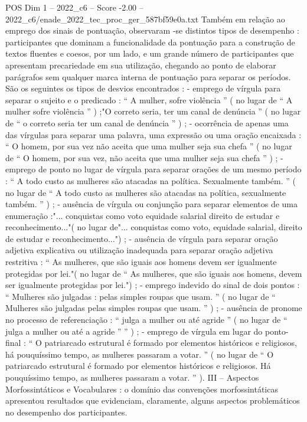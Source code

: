 \begin{textsample}{POS Dim 1 – 2022\_c6 – Score -2.00 – 2022\_c6/enade\_2022\_tec\_proc\_ger\_587bf59e0a.txt}
Também em relação ao emprego dos sinais de pontuação, observaram -se distintos tipos de desempenho : participantes que dominam a funcionalidade da pontuação para a construção de textos fluentes e coesos, por um lado, e um grande número de participantes que apresentam precariedade em sua utilização, chegando ao ponto de elaborar parágrafos sem qualquer marca interna de pontuação para separar os períodos.
São os seguintes os tipos de desvios encontrados : - emprego de vírgula para separar o sujeito e o predicado : “ A mulher, sofre violência ” ( no lugar de “ A mulher sofre violência ” ) ;"O correto seria, ter um canal de denúncia ” ( no lugar de “ o correto seria ter um canal de denúncia ” ) ; - ocorrência de apenas uma das vírgulas para separar uma palavra, uma expressão ou uma oração encaixada : “ O homem, por sua vez não aceita que uma mulher seja sua chefa ” ( no lugar de “ O homem, por sua vez, não aceita que uma mulher seja sua chefa ” ) ; - emprego de ponto no lugar de vírgula para separar orações de um mesmo período : “ A todo custo as mulheres são atacadas na política.
Sexualmente também. ” ( no lugar de “ A todo custo as mulheres são atacadas na política, sexualmente também. ” ) ; - ausência de vírgula ou conjunção para separar elementos de uma enumeração :"... conquistas como voto equidade salarial direito de estudar e reconhecimento..."( no lugar de"... conquistas como voto, equidade salarial, direito de estudar e reconhecimento...") ; - ausência de vírgula para separar oração adjetiva explicativa ou utilização inadequada para separar oração adjetiva restritiva : “ As mulheres, que são iguais aos homens devem ser igualmente protegidas por lei."( no lugar de “ As mulheres, que são iguais aos homens, devem ser igualmente protegidas por lei.") ; - emprego indevido do sinal de dois pontos : “ Mulheres são julgadas : pelas simples roupas que usam. ” ( no lugar de “ Mulheres são julgadas pelas simples roupas que usam. ” ) ; - ausência de pronome no processo de referenciação : “ julga a mulher ou até agride ” ( no lugar de “ julga a mulher ou até a agride ” ” ) ; - emprego de vírgula em lugar do ponto-final : “ O patriarcado estrutural é formado por elementos históricos e religiosos, há pouquíssimo tempo, as mulheres passaram a votar. ” ( no lugar de “ O patriarcado estrutural é formado por elementos históricos e religiosos.
Há pouquíssimo tempo, as mulheres passaram a votar. ” ).
III – Aspectos Morfossintáticos e Vocabulares : o domínio das convenções morfossintáticas apresentou resultados que evidenciam, claramente, alguns aspectos problemáticos no desempenho dos participantes.

\end{textsample}
